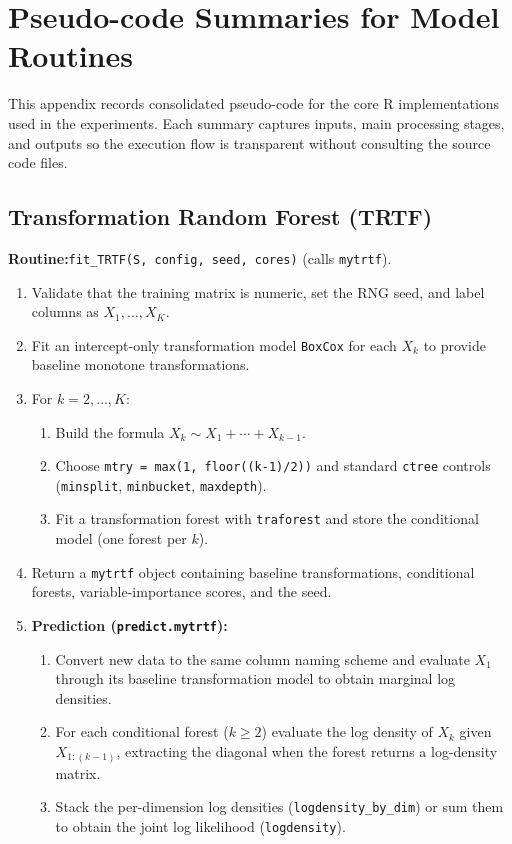 \documentclass[11pt,a4paper,twoside]{book}\usepackage[]{graphicx}\usepackage[]{xcolor}
\begin{document}
\section{Pseudo-code Summaries for Model Routines}

This appendix records consolidated pseudo-code for the core R implementations used in the experiments. Each summary captures inputs, main processing stages, and outputs so the execution flow is transparent without consulting the source code files.

\subsection{Transformation Random Forest (TRTF)}\label{app:trtf}

\textbf{Routine:}\quad\texttt{fit\_TRTF(S, config, seed, cores)} (calls \texttt{mytrtf}).

\begin{enumerate}
  \item Validate that the training matrix is numeric, set the RNG seed, and label columns as $X_1,\ldots,X_K$.
  \item Fit an intercept-only transformation model \texttt{BoxCox} for each $X_k$ to provide baseline monotone transformations.
  \item For $k = 2,\ldots,K$:
    \begin{enumerate}
      \item Build the formula $X_k \sim X_1 + \cdots + X_{k-1}$.
      \item Choose \texttt{mtry = max(1, floor((k-1)/2))} and standard \texttt{ctree} controls (\texttt{minsplit}, \texttt{minbucket}, \texttt{maxdepth}).
      \item Fit a transformation forest with \texttt{traforest} and store the conditional model (one forest per $k$).
    \end{enumerate}
  \item Return a \texttt{mytrtf} object containing baseline transformations, conditional forests, variable-importance scores, and the seed.

  \item \textbf{Prediction (\texttt{predict.mytrtf}):}
    \begin{enumerate}
      \item Convert new data to the same column naming scheme and evaluate $X_1$ through its baseline transformation model to obtain marginal log densities.
      \item For each conditional forest ($k\geq 2$) evaluate the log density of $X_k$ given $X_{1:(k-1)}$, extracting the diagonal when the forest returns a log-density matrix.
      \item Stack the per-dimension log densities (\texttt{logdensity\_by\_dim}) or sum them to obtain the joint log likelihood (\texttt{logdensity}).
    \end{enumerate}
\end{enumerate}
\end{document}
